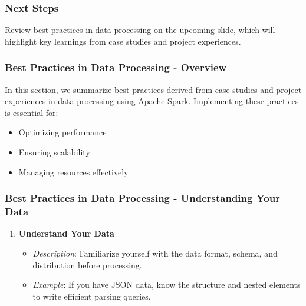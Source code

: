 \documentclass[aspectratio=169]{beamer}
\begin{document}
\begin{frame}[fragile]
    \frametitle{Next Steps}
    Review best practices in data processing on the upcoming slide, which will highlight key learnings from case studies and project experiences.
\end{frame}

\begin{frame}[fragile]
    \frametitle{Best Practices in Data Processing - Overview}
    In this section, we summarize best practices derived from case studies and project experiences in data processing using Apache Spark. Implementing these practices is essential for:
    \begin{itemize}
        \item Optimizing performance
        \item Ensuring scalability
        \item Managing resources effectively
    \end{itemize}
\end{frame}

\begin{frame}[fragile]
    \frametitle{Best Practices in Data Processing - Understanding Your Data}
    \begin{enumerate}
        \item \textbf{Understand Your Data}
        \begin{itemize}
            \item \textit{Description}: Familiarize yourself with the data format, schema, and distribution before processing.
            \item \textit{Example}: If you have JSON data, know the structure and nested elements to write efficient parsing queries.
        \end{itemize}
    \end{enumerate}
\end{frame}
\end{document}
